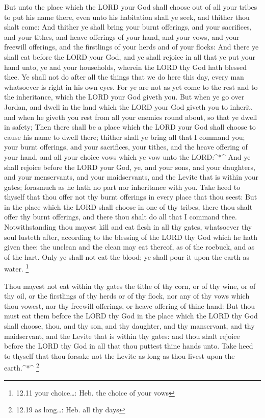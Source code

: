 But unto the place which the LORD your God shall choose out
of all your tribes to put his name there, even unto his habitation shall
ye seek, and thither thou shalt come:  And thither ye shall
bring your burnt offerings, and your sacrifices, and your tithes, and
heave offerings of your hand, and your vows, and your freewill
offerings, and the firstlings of your herds and of your flocks:
 And there ye shall eat before the LORD your God, and ye
shall rejoice in all that ye put your hand unto, ye and your households,
wherein the LORD thy God hath blessed thee.  Ye shall not do
after all the things that we do here this day, every man whatsoever is
right in his own eyes.  For ye are not as yet come to the
rest and to the inheritance, which the LORD your God giveth you.
 But when ye go over Jordan, and dwell in the land which
the LORD your God giveth you to inherit, and when he giveth you rest
from all your enemies round about, so that ye dwell in safety;
 Then there shall be a place which the LORD your God shall
choose to cause his name to dwell there; thither shall ye bring all that
I command you; your burnt offerings, and your sacrifices, your tithes,
and the heave offering of your hand, and all your choice vows which ye
vow unto the LORD:\^{}*\^{}  And ye shall rejoice before
the LORD your God, ye, and your sons, and your daughters, and your
menservants, and your maidservants, and the Levite that is within your
gates; forasmuch as he hath no part nor inheritance with you.
 Take heed to thyself that thou offer not thy burnt
offerings in every place that thou seest:  But in the place
which the LORD shall choose in one of thy tribes, there thou shalt offer
thy burnt offerings, and there thou shalt do all that I command thee.
 Notwithstanding thou mayest kill and eat flesh in all thy
gates, whatsoever thy soul lusteth after, according to the blessing of
the LORD thy God which he hath given thee: the unclean and the clean may
eat thereof, as of the roebuck, and as of the hart.  Only
ye shall not eat the blood; ye shall pour it upon the earth as water.
\footnote{12.11 your choice\ldots: Heb. the choice of your vows}

 Thou mayest not eat within thy gates the tithe of thy
corn, or of thy wine, or of thy oil, or the firstlings of thy herds or
of thy flock, nor any of thy vows which thou vowest, nor thy freewill
offerings, or heave offering of thine hand:  But thou must
eat them before the LORD thy God in the place which the LORD thy God
shall choose, thou, and thy son, and thy daughter, and thy manservant,
and thy maidservant, and the Levite that is within thy gates: and thou
shalt rejoice before the LORD thy God in all that thou puttest thine
hands unto.  Take heed to thyself that thou forsake not the
Levite as long as thou livest upon the earth.\^{}*\^{} \footnote{12.19
  as long\ldots: Heb. all thy days}


